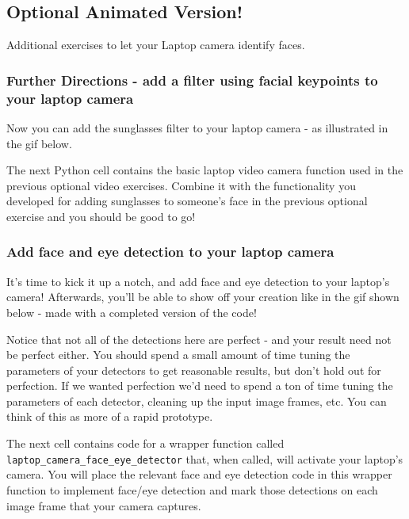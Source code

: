 \documentclass[11pt]{article}
\begin{document}
    \subsection{Optional Animated Version!}\label{optional-animated-version}

Additional exercises to let your Laptop camera identify faces.

    \subsubsection{Further Directions - add a filter using facial keypoints
to your laptop
camera}\label{further-directions---add-a-filter-using-facial-keypoints-to-your-laptop-camera}

Now you can add the sunglasses filter to your laptop camera - as
illustrated in the gif below.

The next Python cell contains the basic laptop video camera function
used in the previous optional video exercises. Combine it with the
functionality you developed for adding sunglasses to someone's face in
the previous optional exercise and you should be good to go!

    \subsubsection{Add face and eye detection to your laptop
camera}\label{add-face-and-eye-detection-to-your-laptop-camera}

It's time to kick it up a notch, and add face and eye detection to your
laptop's camera! Afterwards, you'll be able to show off your creation
like in the gif shown below - made with a completed version of the code!

Notice that not all of the detections here are perfect - and your result
need not be perfect either. You should spend a small amount of time
tuning the parameters of your detectors to get reasonable results, but
don't hold out for perfection. If we wanted perfection we'd need to
spend a ton of time tuning the parameters of each detector, cleaning up
the input image frames, etc. You can think of this as more of a rapid
prototype.

The next cell contains code for a wrapper function called
\texttt{laptop\_camera\_face\_eye\_detector} that, when called, will
activate your laptop's camera. You will place the relevant face and eye
detection code in this wrapper function to implement face/eye detection
and mark those detections on each image frame that your camera captures.
\end{document}
